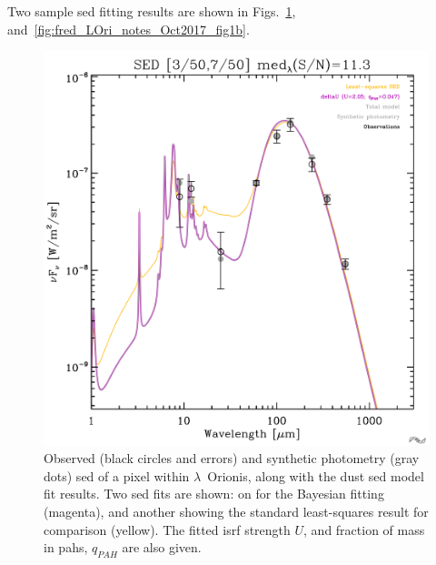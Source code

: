           Two sample \acrshort{sed} fitting results are shown in Figs.~\ref{fig:fred_LOri_notes_Oct2017_fig1a}, and~\ref{fig:fred_LOri_notes_Oct2017_fig1b}.
              \begin{figure}
                \includegraphics[width=\textwidth]{../Plots/ch_lori/fred_LOri_notes_Oct2017_fig1a.pdf}
                \centering
                \caption{Observed (black circles and errors) and synthetic photometry (gray dots) \acrshort{sed} of a pixel within $\lambda$~Orionis, along with the dust \acrshort{sed} model fit results. Two \acrshort{sed} fits are shown: on for the Bayesian fitting (magenta), and another showing the standard least-squares result for comparison (yellow). The fitted \acrshort{isrf} strength $U$, and fraction of mass in \acrshort{pah}s, $q_{PAH}$ are also given.}
                \label{fig:fred_LOri_notes_Oct2017_fig1a}
              \end{figure}
